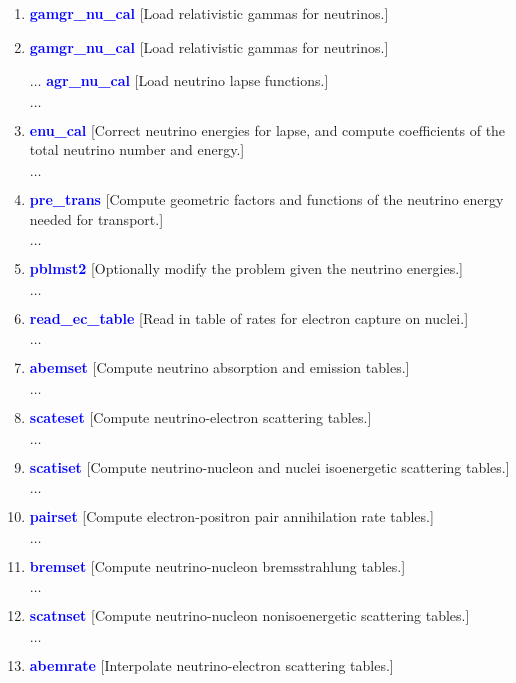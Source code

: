 \documentclass[11pt,doublespace]{article}
\begin{document}
\begin{itemize}
\begin{enumerate}
\begin{enumerate}
\begin{enumerate}
{\begin{enumerate}

  \item \textcolor{blue}{ {\bf gamgr\_nu\_cal} }
  [Load relativistic gammas for neutrinos.]

  \item \textcolor{blue}{ {\bf gamgr\_nu\_cal} }
  [Load relativistic gammas for neutrinos.]
   
  $\ldots$ \textcolor{blue}{ {\bf agr\_nu\_cal} }
  [Load neutrino lapse functions.]

  $\ldots$ \item \textcolor{blue}{ {\bf enu\_cal} }
  [Correct neutrino energies for lapse, and compute coefficients of the total neutrino number and energy.]

  $\ldots$ \item \textcolor{blue}{ {\bf pre\_trans} }
  [Compute geometric factors and functions of the neutrino energy needed for transport.]

  $\ldots$ \item \textcolor{blue}{ {\bf pblmst2} }
  [Optionally modify the problem given the neutrino energies.]

  $\ldots$ \item \textcolor{blue}{ {\bf read\_ec\_table} }
  [Read in table of rates for electron capture on nuclei.]

  $\ldots$ \item \textcolor{blue}{ {\bf abemset} }
  [Compute neutrino absorption and emission tables.]

  $\ldots$ \item \textcolor{blue}{ {\bf scateset} }
  [Compute neutrino-electron scattering tables.]

  $\ldots$ \item \textcolor{blue}{ {\bf scatiset} }
  [Compute neutrino-nucleon and nuclei isoenergetic scattering tables.]

  $\ldots$ \item \textcolor{blue}{ {\bf pairset} }
  [Compute electron-positron pair annihilation rate tables.]

  $\ldots$ \item \textcolor{blue}{ {\bf bremset} }
  [Compute neutrino-nucleon bremsstrahlung tables.]

  $\ldots$ \item \textcolor{blue}{ {\bf scatnset} }
  [Compute neutrino-nucleon nonisoenergetic scattering tables.]

  $\ldots$ \item \textcolor{blue}{ {\bf abemrate} }
  [Interpolate neutrino-electron scattering tables.]


\end{enumerate}}
\end{enumerate}
\end{enumerate}
\end{enumerate}
\end{itemize}
\end{document}

